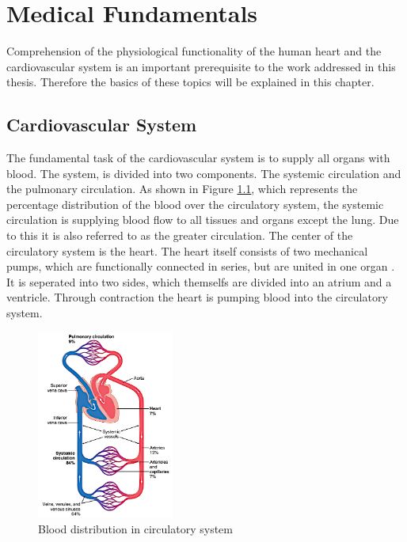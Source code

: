 \chapter{Medical Fundamentals}
Comprehension of the physiological functionality of the human heart and the cardiovascular system is an important prerequisite to the work addressed in this thesis. Therefore the basics of these topics will be explained in this chapter.

\section{Cardiovascular System}
The fundamental task of the cardiovascular system is to supply all organs with blood. The system, is divided into two components. The systemic circulation and the pulmonary circulation. As shown in Figure \ref{fig:circulation}, which represents the percentage distribution of the blood over the circulatory system, the systemic circulation is supplying blood flow to all tissues and organs except the lung. Due to this it is also referred to as the greater circulation. \cite{GH20} The center of the circulatory system is the heart. The heart itself consists of two mechanical pumps, which are functionally connected in series, but are united in one organ \cite{HKS4}. It is seperated into two sides, which themselfs are divided into an atrium and a ventricle.  \cite{HKS7} Through contraction the heart is pumping blood into the circulatory system. 

\begin{figure}
  \centering
  \includegraphics[width=0.4\textwidth, height=0.6\textwidth]{images/circulation.jpg}
  \caption{Blood distribution in circulatory system \cite{GH20}}
  \label{fig:circulation}
\end{figure}

